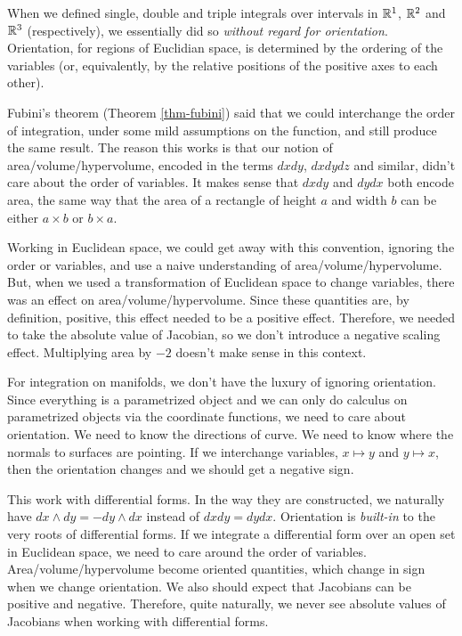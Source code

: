 \documentclass[fleqn,letterpaper]{report}
\begin{document}
When we defined single, double and triple integrals over
intervals in $\mathbb{R}^1$, $\mathbb{R}^2$ and $\mathbb{R}^3$ (respectively), we
essentially did so \emph{without regard for orientation}.
Orientation, for regions of Euclidian space, is determined by
the ordering of the variables (or, equivalently, by the
relative positions of the positive axes to each other). 

Fubini's theorem (Theorem \ref{thm-fubini}) said that we could
interchange the order of integration, under some mild
assumptions on the function, and still produce the same
result. The reason this works is that our notion of
area/volume/hypervolume, encoded in the terms $dxdy$, $dxdydz$ and
similar, didn't care about the order of variables. It makes
sense that $dxdy$ and $dydx$ both encode area, the same way
that the area of a rectangle of height $a$ and width $b$ can
be either $a \times b$ or $b \times a$. 

Working in Euclidean space, we could get away with this
convention, ignoring the order or variables, and use a naive
understanding of area/volume/hypervolume. But, when we
used a transformation of Euclidean space to change variables,
there was an effect on area/volume/hypervolume. Since these
quantities are, by definition, positive, this effect needed to
be a positive effect. Therefore, we needed to take the
absolute value of Jacobian, so we don't introduce a negative
scaling effect. Multiplying area by $-2$ doesn't make sense in
this context.

For integration on manifolds, we don't have the luxury of
ignoring orientation. Since everything is a parametrized
object and we can only do calculus on parametrized objects via
the coordinate functions, we need to care about orientation.
We need to know the directions of curve. We need to know where
the normals to surfaces are pointing. If we interchange
variables, $x \mapsto y$ and $y \mapsto x$, then the orientation
changes and we should get a negative sign.

This work with differential forms. In the way they are
constructed, we naturally have $dx \wedge dy = -dy \wedge dx$
instead of $dx dy = dy dx$. Orientation is \emph{built-in} to
the very roots of differential forms. If we integrate a
differential form over an open set in Euclidean space, we need
to care around the order of variables. Area/volume/hypervolume
become oriented quantities, which change in sign when we change
orientation. We also should expect that Jacobians
can be positive and negative. Therefore, quite naturally, we
never see absolute values of Jacobians when working with
differential forms. 
\end{document}
